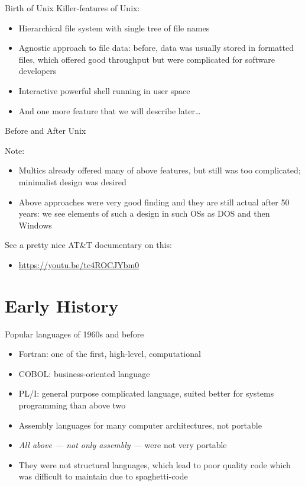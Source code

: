 \documentclass[xetex,aspectratio=169]{beamer}
\begin{document}
\begin{frame}{Birth of Unix}
Killer-features of Unix:

\begin{itemize}
	\item Hierarchical file system with single tree of file names
	\item Agnostic approach to file data: before, data was usually stored in formatted files, which offered good throughput but were complicated for software developers
	\item Interactive powerful shell running in user space
	\pause
	\item And one more feature that we will describe later\ldots
\end{itemize}

\end{frame}

\begin{frame}{Before and After Unix}

Note:

\begin{itemize}
	\item Multics already offered many of above features, but still was too complicated; minimalist design was desired
	\item Above approaches were very good finding and they are still actual after 50 years: we see elements of such a design in such OSs as DOS and then Windows
\end{itemize}

See a pretty nice AT\&T documentary on this:
\begin{itemize}
	\item \url{https://youtu.be/tc4ROCJYbm0}
\end{itemize}

\end{frame}

\section{Early History}

\begin{frame}{Popular languages of 1960s and before}
	\begin{itemize}
		\item Fortran: one of the first, high-level, computational
		\item COBOL: business-oriented language
		\item PL/I: general purpose complicated language, suited better for systems programming than above two
		\item Assembly languages for many computer architectures, not portable
	\end{itemize}

\pause

	\begin{itemize}
		\item \emph{All above --- not only assembly ---} were not very portable
		\item They were not structural languages, which lead to poor quality code which was difficult to maintain due to spaghetti-code
	\end{itemize}
\end{frame}
\end{document}
